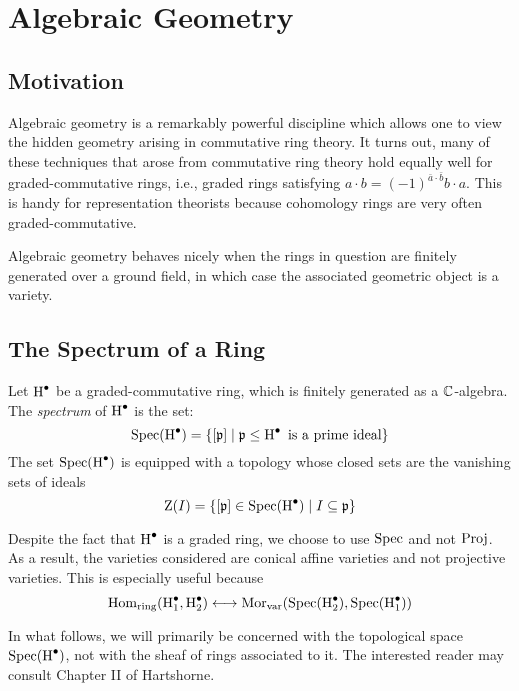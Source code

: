 \chapter{Algebraic Geometry}
\label{chap:ag-git}

\section{Motivation}
\label{sec:motivation-ag}

Algebraic geometry is a remarkably powerful discipline which allows one to view the hidden geometry arising in commutative ring theory. It turns out, many of these techniques that arose from commutative ring theory hold equally well for graded-commutative rings, i.e., graded rings satisfying $a \cdot b = (-1)^{\bar a \cdot \bar b} b \cdot a$. This is handy for representation theorists because cohomology rings are very often graded-commutative.

Algebraic geometry behaves nicely when the rings in question are finitely generated over a ground field, in which case the associated geometric object is a variety.

\section{The Spectrum of a Ring}
\label{sec:spec}

\begin{definition}
  Let $\operatorname{H}^\bullet$ be a graded-commutative ring, which is finitely generated as a $\mathbb{C}$-algebra. The \emph{spectrum} of $\operatorname{H}^\bullet$ is the set:
  \[
\operatorname{Spec}(\operatorname{H}^\bullet) = \left\{ [\mathfrak{p}] \mid \mathfrak{p} \leq \operatorname{H}^\bullet \text{ is a prime ideal} \right\}
  \]
  The set $\operatorname{Spec}(\operatorname{H}^\bullet)$ is equipped with a topology whose closed sets are the vanishing sets of ideals
  \[
    \operatorname{Z}(I) = \left\{ [\mathfrak{p}] \in \operatorname{Spec}(\operatorname{H}^\bullet) \mid I \subseteq \mathfrak{p} \right\}
  \]
\end{definition}

\begin{note}
  Despite the fact that $\operatorname{H}^\bullet$ is a graded ring, we choose to use $\operatorname{Spec}$ and not $\operatorname{Proj}$. As a result, the varieties considered are conical affine varieties and not projective varieties. This is especially useful because
  \[
    \operatorname{Hom}_\text{ring}(\operatorname{H}^\bullet_1,\operatorname{H}^\bullet_2) \longleftrightarrow \operatorname{Mor}_\text{var}(\operatorname{Spec}(\operatorname{H}^\bullet_2),\operatorname{Spec}(\operatorname{H}^\bullet_1))
  \]
  
\end{note}

In what follows, we will primarily be concerned with the topological space $\operatorname{Spec}(\operatorname{H}^\bullet)$, not with the sheaf of rings associated to it. The interested reader may consult Chapter II of Hartshorne\cite{hartshorne}.

